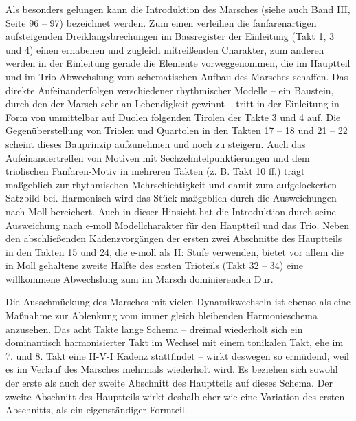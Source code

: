\begin{figure}
\img{}
\caption{}
\end{figure}

Als besonders gelungen kann die Introduktion des Marsches (siehe auch
Band III, Seite 96 – 97) bezeichnet werden. Zum einen verleihen die
fanfarenartigen aufsteigenden Dreiklangsbrechungen im Bassregister der
Einleitung (Takt 1, 3 und 4) einen erhabenen und zugleich mitreißenden
Charakter, zum anderen werden in der Einleitung gerade die Elemente
vorweggenommen, die im Hauptteil und im Trio Abwechslung vom
schematischen Aufbau des Marsches schaffen. Das direkte
Aufeinanderfolgen verschiedener rhythmischer Modelle – ein Baustein,
durch den der Marsch sehr an Lebendigkeit gewinnt – tritt in der
Einleitung in Form von unmittelbar auf Duolen folgenden Tirolen der
Takte 3 und 4 auf. Die Gegenüberstellung von Triolen und Quartolen in
den Takten 17 – 18 und 21 – 22 scheint dieses Bauprinzip aufzunehmen
und noch zu steigern. Auch das Aufeinandertreffen von Motiven mit
Sechzehntelpunktierungen und dem triolischen Fanfaren-Motiv in mehreren
Takten (z. B. Takt 10 ff.) trägt maßgeblich zur rhythmischen
Mehrschichtigkeit und damit zum aufgelockerten Satzbild bei. Harmonisch
wird das Stück maßgeblich durch die Ausweichungen nach Moll bereichert.
Auch in dieser Hinsicht hat die Introduktion durch seine Ausweichung
nach e-moll Modellcharakter für den Hauptteil und das Trio. Neben den
abschließenden Kadenzvorgängen der ersten zwei Abschnitte des
Hauptteils in den Takten 15 und 24, die e-moll als II: Stufe verwenden,
bietet vor allem die in Moll gehaltene zweite Hälfte des ersten
Trioteils (Takt 32 – 34) eine willkommene Abwechslung zum im Marsch
dominierenden Dur.

Die Ausschmückung des Marsches mit vielen Dynamikwechseln ist ebenso als
eine Maßnahme zur Ablenkung vom immer gleich bleibenden Harmonieschema
anzusehen. Das acht Takte lange Schema – dreimal wiederholt sich ein
dominantisch harmonisierter Takt im Wechsel mit einem tonikalen Takt,
ehe im 7. und 8. Takt eine\newline
II-V-I Kadenz stattfindet – wirkt deswegen so ermüdend, weil es im
Verlauf des Marsches mehrmals wiederholt wird. Es beziehen sich sowohl
der erste als auch der zweite Abschnitt des Hauptteils auf dieses
Schema. Der zweite Abschnitt des Hauptteils wirkt deshalb eher wie eine
Variation des ersten Abschnitts, als ein eigenständiger Formteil.
